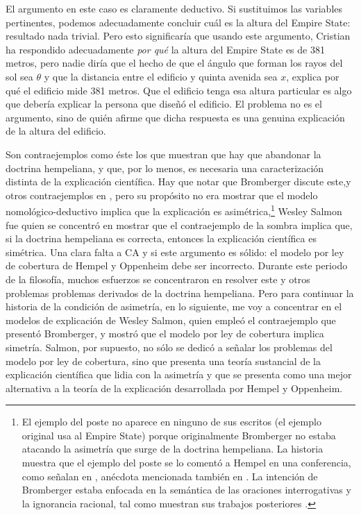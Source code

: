 El argumento en este caso es claramente deductivo. Si
sustituimos las variables pertinentes, podemos adecuadamente
concluir cuál es la altura del Empire State: resultado nada
trivial. Pero esto significaría que usando este argumento,
Cristian ha respondido adecuadamente \emph{por qué} la
altura del Empire State es de 381 metros, pero nadie diría
que el hecho de que el ángulo que forman los rayos del sol
sea $ \theta $ y que la distancia entre el edificio y quinta
avenida sea $ x $, explica por qué el edificio mide 381
metros. Que el edificio tenga esa altura particular es algo
que debería explicar la persona que diseñó el edificio. El
problema no es el argumento, sino de quién afirme que dicha
respuesta es una genuina explicación de la altura del
edificio.

Son contraejemplos como éste los que muestran que hay que
abandonar la doctrina hempeliana, y que, por lo menos, es
necesaria una caracterización distinta de la explicación
científica. Hay que notar que Bromberger discute
este,y otros contraejemplos en \citeyear{Bromberger1966}, pero
su propósito no era mostrar que el modelo
nomológico-deductivo implica que la explicación es
asimétrica,\footnote{ 
  El ejemplo del poste no aparece en ninguno de sus escritos
  (el ejemplo original usa al Empire State) porque
  originalmente Bromberger no estaba atacando la asimetría
  que surge de la doctrina hempeliana. La historia muestra
  que el ejemplo del poste se lo comentó a Hempel en una
  conferencia, como señalan en \parencite{mitBromberger},
  anécdota mencionada también en
  \parencite[p.~81]{Dewulf2022}. La intención de Bromberger
  estaba enfocada en la semántica de las oraciones
  interrogativas y la ignorancia racional, tal como muestran
  sus trabajos posteriores \parencite{Bromberger1992}.
}
Wesley Salmon fue quien se concentró en mostrar que el
contraejemplo de la sombra implica que, si la doctrina
hempeliana es correcta, entonces la explicación científica
es simétrica. Una clara falta a CA y si este argumento es
sólido: el modelo por ley de cobertura de Hempel y Oppenheim
debe ser incorrecto. Durante este periodo de la filosofía,
muchos esfuerzos se concentraron en resolver este y otros
problemas problemas derivados de la doctrina hempeliana.
Pero para continuar la historia de la condición de
asimetría, en lo siguiente,  me voy a concentrar en el
modelos de explicación de Wesley Salmon, quien empleó el contraejemplo que presentó
Bromberger, y mostró que el modelo por ley de cobertura
implica simetría. Salmon, por supuesto, no sólo se dedicó a
señalar los problemas del modelo por ley de cobertura, sino
que presenta una teoría sustancial de
la explicación científica que lidia con la
asimetría y que se presenta como una mejor alternativa a la
teoría de la explicación desarrollada por Hempel y 
Oppenheim.

